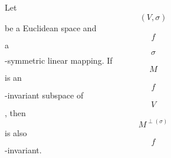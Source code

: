 Let $$(V, \sigma)$$ be a Euclidean space and $$f$$ a $$\sigma$$-symmetric linear mapping. If $$M$$ is an $$f$$-invariant subspace of $$V$$, then $$M^{\perp(\sigma)}$$ is also $$f$$-invariant.
